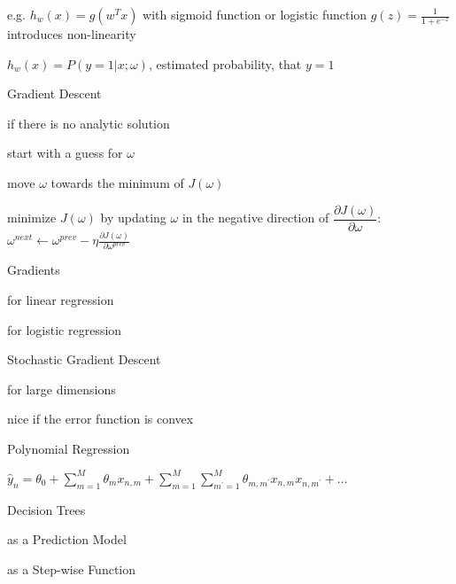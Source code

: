\documentclass[landscape, a4paper]{article}
\begin{document}
\begin{minipage}[t]{0.2\linewidth}
\begin{betterlist}
\begin{betterlist}
\begin{betterlist}
				\begin{betterlist}
					\item e.g. $h_w(x) = g(w^Tx)$ with \alert{sigmoid} function or \alert{logistic function} $\displaystyle g(z) = \frac{1}{1 + e^{-z}}$ introduces \alert{non-linearity}
					\item $h_w(x) = P(y=1|x; \omega)$, estimated probability, that $y = 1$
				\end{betterlist}
				\item Gradient Descent
				\begin{betterlist}
					\item  if there is \alert{no analytic solution}
					\item start with a guess for $\omega$
					\item move $\omega$ towards the minimum of $J(\omega)$
					\item minimize $J(\omega)$ by updating $\omega$ in the negative direction of $\dfrac{\partial J(\omega)}{\partial\omega}$: $\displaystyle\omega^{next} \leftarrow \omega^{prev} - \eta \frac{\partial J(\omega)}{\partial\omega^{prev}} $
					\item Gradients
					\begin{betterlist}
						\item for \alert{linear regression}
						\item for \alert{logistic regression}
					\end{betterlist}
					\item Stochastic Gradient Descent
					\begin{betterlist}
						\item for \alert{large dimensions}
						\item nice if the error function is \alert{convex}
					\end{betterlist}
				\end{betterlist}
			\end{betterlist}
		\end{betterlist}
		\item Polynomial Regression
		\begin{betterlist}
			\item $\displaystyle\hat{y}_n=\theta_0+\sum_{m=1}^M \theta_m x_{n, m}+\sum_{m=1}^M \sum_{m^{\prime}=1}^M \theta_{m, m^{\prime}} x_{n, m} x_{n, m^{\prime}}+\ldots$
			\item Decision Trees
			\begin{betterlist}
				\item as a Prediction Model
				\item as a Step-wise Function

\end{betterlist}
\end{betterlist}
\end{betterlist}
\end{minipage}
\end{document}
